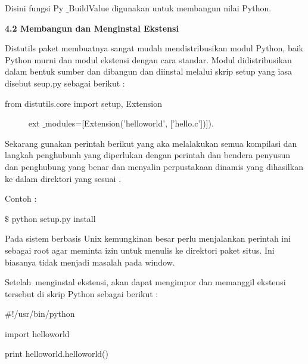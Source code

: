 \noindent 
 \hspace*{0.5in} Disini fungsi Py $  \_  $BuildValue digunakan untuk membangun nilai Python.  \par
\vspace{12pt}
\vspace{12pt}
\noindent 
\textbf{4.2 Membangun dan Menginstal Ekstensi} \par
\vspace{12pt}
\vspace{12pt}
\noindent 
 \hspace*{0.5in} Distutils paket membuatnya sangat mudah mendistribusikan modul Python, baik Python murni dan modul ekstensi dengan cara standar. Modul didistribusikan dalam bentuk sumber dan dibangun dan diinstal melalui skrip setup yang iasa disebut seup.py sebagai berikut : \par
\noindent 
from distutils.core import setup, Extension \par
~~~~~ ext $  \_  $modules=[Extension('helloworld', ['hello.c'])]). \par
\vspace{12pt}
\noindent 
 \hspace*{0.5in} Sekarang gunakan perintah berikut yang aka melalakukan semua kompilasi dan langkah penghubunh yang diperlukan dengan perintah dan bendera penyusun dan penghubung yang benar dan menyalin perpustakaan dinamis yang dihasilkan ke dalam direktori yang sesuai . \par
\vspace{12pt}
\noindent 
Contoh : \par
\noindent 
 $  \$  $ python setup.py install \par
\vspace{12pt}
\noindent 
 \hspace*{0.5in} Pada sistem berbasis Unix kemungkinan besar perlu menjalankan perintah ini sebagai root agar meminta izin untuk menulis ke direktori paket situs. Ini biasanya tidak menjadi masalah pada window. \par
Setelah~menginstal ekstensi, akan dapat mengimpor dan memanggil ekstensi tersebut di skrip Python  sebagai berikut : \par
\noindent 
 $  \#  $!/usr/bin/python \par
\noindent 
import helloworld \par
\vspace{12pt}
\noindent 
print helloworld.helloworld() \par
\vspace{14pt}
